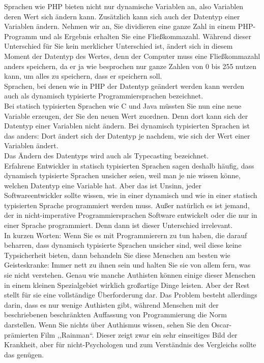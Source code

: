 Sprachen wie PHP bieten nicht nur dynamische Variablen an, also Variablen deren Wert sich ändern kann. Zusätzlich kann sich auch der Datentyp einer Variablen ändern. Nehmen wir an, Sie dividieren eine ganze Zahl in einem PHP-Programm und als Ergebnis erhalten Sie eine Fließkommazahl. Während dieser Unterschied für Sie kein merklicher Unterschied ist, ändert sich in diesem Moment der Datentyp des Wertes, denn der Computer muss eine Fließkommazahl anders speichern, da er ja wie besprochen nur ganze Zahlen von 0 bis 255 nutzen kann, um alles zu speichern, dass er speichern soll.\\

Sprachen, bei denen wie in PHP der Datentyp geändert werden kann werden auch als dynamisch typisierte Programmiersprachen bezeichnet.\\

Bei statisch typisierten Sprachen wie C und Java müssten Sie nun eine neue Variable erzeugen, der Sie den neuen Wert zuordnen. Denn dort kann sich der Datentyp einer Variablen nicht ändern. Bei dynamisch typisierten Sprachen ist das anders: Dort ändert sich der Datentyp je nachdem, wie sich der Wert einer Variablen ändert.\\

Das Ändern des Datentyps wird auch als Typecasting bezeichnet.\\

Erfahrene Entwickler in statisch typisierten Sprachen sagen deshalb häufig, dass dynamisch typisierte Sprachen unsicher seien, weil man je nie wissen könne, welchen Datentyp eine Variable hat. Aber das ist Unsinn, jeder Softwareentwickler sollte wissen, wie in einer dynamisch und wie in einer statisch typisierten Sprache programmiert werden muss. Außer natürlich es ist jemand, der in nicht-imperative Programmiersprachen Software entwickelt oder die nur in einer Sprache programmiert. Denn dann ist dieser Unterschied irrelevant.\\

In kurzen Worten: Wenn Sie es mit Programmierern zu tun haben, die darauf beharren, dass dynamisch typisierte Sprachen unsicher sind, weil diese keine Typsicherheit bieten, dann behandeln Sie diese Menschen am besten wie Geisteskranke: Immer nett zu ihnen sein und halten Sie sie von allem fern, was sie nicht verstehen. Genau wie manche Authisten können einige dieser Menschen in einem kleinen Spezialgebiet wirklich großartige Dinge leisten. Aber der Rest stellt für sie eine vollständige Überforderung dar. Das Problem besteht allerdings darin, dass es nur wenige Authisten gibt, während Menschen mit der beschriebenen beschränkten Auffassung von Programmierung die Norm darstellen. Wenn Sie nichts über Authismus wissen, sehen Sie den Oscar-prämierten Film ,,Rainman``. Dieser zeigt zwar ein sehr einseitiges Bild der Krankheit, aber für nicht-Psychologen und zum Verständnis des Vergleichs sollte das genügen.

